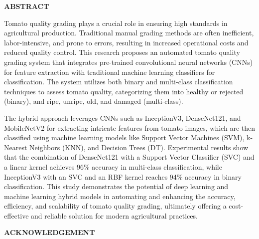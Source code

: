 \documentclass[12pt,a4paper]{report}
\begin{document}
	
\setcounter{page}{1} 

	




















	
   \begin{center}
	\textbf{\Large ABSTRACT}\\[0.5cm]
\end{center}
	
Tomato quality grading plays a crucial role in ensuring high standards in agricultural production. Traditional manual grading methods are often inefficient, labor-intensive, and prone to errors, resulting in increased operational costs and reduced quality control. This research proposes an automated tomato quality grading system that integrates pre-trained convolutional neural networks (CNNs) for feature extraction with traditional machine learning classifiers for classification. The system utilizes both binary and multi-class classification techniques to assess tomato quality, categorizing them into healthy or rejected (binary), and ripe, unripe, old, and damaged (multi-class).

 The hybrid approach leverages CNNs such as InceptionV3, DenseNet121, and MobileNetV2 for extracting intricate features from tomato images, which are then classified using machine learning models like Support Vector Machines (SVM), k-Nearest Neighbors (KNN), and Decision Trees (DT). Experimental results show that the combination of DenseNet121 with a Support Vector Classifier (SVC) and a linear kernel achieves 96\% accuracy in multi-class classification, while InceptionV3 with an SVC and an RBF kernel reaches 94\% accuracy in binary classification. This study demonstrates the potential of deep learning and machine learning hybrid models in automating and enhancing the accuracy, efficiency, and scalability of tomato quality grading, ultimately offering a cost-effective and reliable solution for modern agricultural practices.
 
 

 \newpage
 \setcounter{page}{3} 
 \begin{center}
 	\textbf{\Large ACKNOWLEDGEMENT}\\[0.4cm]
 \end{center}
 
\end{document}
